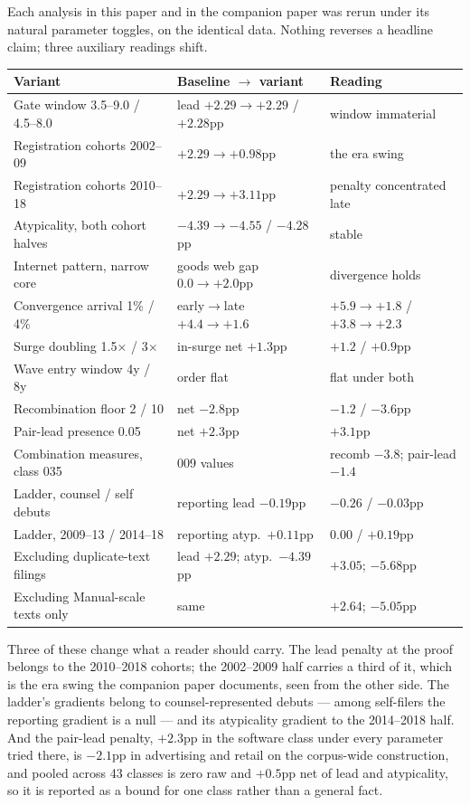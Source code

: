 Each analysis in this paper and in the companion paper was rerun under its
natural parameter toggles, on the identical data. Nothing
reverses a headline claim; three auxiliary readings shift.

\begin{center}\small
\begin{tabular}{lll}
\toprule
Variant & Baseline $\to$ variant & Reading \\
\midrule
Gate window 3.5--9.0 / 4.5--8.0 & lead $+2.29 \to +2.29$ / $+2.28$pp & window immaterial \\
Registration cohorts 2002--09 & $+2.29 \to +0.98$pp & the era swing \\
Registration cohorts 2010--18 & $+2.29 \to +3.11$pp & penalty concentrated late \\
Atypicality, both cohort halves & $-4.39 \to -4.55$ / $-4.28$pp & stable \\
Internet pattern, narrow core & goods web gap $0.0 \to +2.0$pp & divergence holds \\
Convergence arrival 1\% / 4\% & early$\to$late $+4.4\to+1.6$ & $+5.9\to+1.8$ / $+3.8\to+2.3$ \\
Surge doubling 1.5$\times$ / 3$\times$ & in-surge net $+1.3$pp & $+1.2$ / $+0.9$pp \\
Wave entry window 4y / 8y & order flat & flat under both \\
Recombination floor 2 / 10 & net $-2.8$pp & $-1.2$ / $-3.6$pp \\
Pair-lead presence 0.05 & net $+2.3$pp & $+3.1$pp \\
Combination measures, class 035 & 009 values & recomb $-3.8$; pair-lead $-1.4$ \\
Ladder, counsel / self debuts & reporting lead $-0.19$pp & $-0.26$ / $-0.03$pp \\
Ladder, 2009--13 / 2014--18 & reporting atyp.\ $+0.11$pp & $0.00$ / $+0.19$pp \\
Excluding duplicate-text filings & lead $+2.29$; atyp.\ $-4.39$pp & $+3.05$; $-5.68$pp \\
Excluding Manual-scale texts only & same & $+2.64$; $-5.05$pp \\
\bottomrule
\end{tabular}
\end{center}

\noindent Three of these change what a reader should carry. The lead
penalty at the proof belongs to the 2010--2018 cohorts; the 2002--2009 half
carries a third of it, which is the era swing the companion paper documents, seen
from the other side. The ladder's gradients belong to counsel-represented
debuts --- among self-filers the reporting gradient is a null --- and its
atypicality gradient to the 2014--2018 half. And the pair-lead penalty,
$+2.3$pp in the software class under every parameter tried there, is
$-2.1$pp in advertising and retail on the corpus-wide construction, and
pooled across 43 classes is zero raw and $+0.5$pp net of lead and
atypicality, so it is reported as a bound for one class rather than a
general fact.

